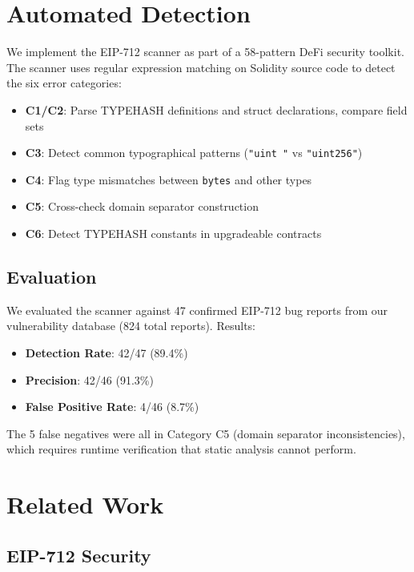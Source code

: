 \documentclass[conference]{IEEEtran}
\begin{document}
\section{Automated Detection}

We implement the EIP-712 scanner as part of a 58-pattern DeFi security toolkit. The scanner uses regular expression matching on Solidity source code to detect the six error categories:

\begin{itemize}
    \item \textbf{C1/C2}: Parse TYPEHASH definitions and struct declarations, compare field sets
    \item \textbf{C3}: Detect common typographical patterns (\texttt{"uint "} vs \texttt{"uint256"})
    \item \textbf{C4}: Flag type mismatches between \texttt{bytes} and other types
    \item \textbf{C5}: Cross-check domain separator construction
    \item \textbf{C6}: Detect TYPEHASH constants in upgradeable contracts
\end{itemize}

\subsection{Evaluation}

We evaluated the scanner against 47 confirmed EIP-712 bug reports from our vulnerability database (824 total reports). Results:

\begin{itemize}
    \item \textbf{Detection Rate}: 42/47 (89.4\%)
    \item \textbf{Precision}: 42/46 (91.3\%)
    \item \textbf{False Positive Rate}: 4/46 (8.7\%)
\end{itemize}

The 5 false negatives were all in Category C5 (domain separator inconsistencies), which requires runtime verification that static analysis cannot perform.

\section{Related Work}

\subsection{EIP-712 Security}
\end{document}
